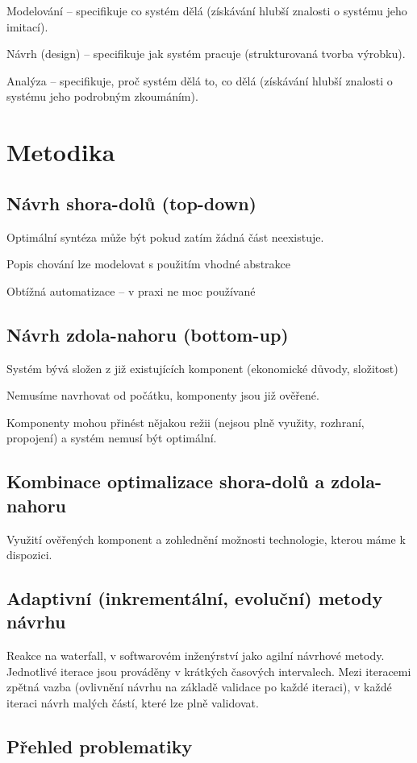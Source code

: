\documentclass[a4paper, 11pt]{report}
\begin{document}
Modelování -- specifikuje co systém dělá (získávání hlubší znalosti o systému jeho imitací).

Návrh (design) -- specifikuje jak systém pracuje (strukturovaná tvorba výrobku).

Analýza -- specifikuje, proč systém dělá to, co dělá (získávání hlubší znalosti o systému jeho podrobným zkoumáním).

\section{Metodika}
\subsection{Návrh shora-dolů (top-down)}
Optimální syntéza může být pokud zatím žádná část neexistuje.

Popis chování lze modelovat s použitím vhodné abstrakce

Obtížná automatizace -- v praxi ne moc používané

\subsection{Návrh zdola-nahoru (bottom-up)}
Systém bývá složen z již existujících komponent (ekonomické důvody, složitost)

Nemusíme navrhovat od počátku, komponenty jsou již ověřené.

Komponenty mohou přinést nějakou režii (nejsou plně využity, rozhraní, propojení) a systém nemusí být optimální.

\subsection{Kombinace optimalizace shora-dolů a zdola-nahoru}
Využití ověřených komponent a zohlednění možnosti technologie, kterou máme k dispozici.

\subsection{Adaptivní (inkrementální, evoluční) metody návrhu}
Reakce na waterfall, v softwarovém inženýrství jako agilní návrhové metody. Jednotlivé iterace jsou prováděny v krátkých časových intervalech. Mezi iteracemi zpětná vazba (ovlivnění návrhu na základě validace po každé iteraci), v každé iteraci návrh malých částí, které lze plně validovat.

\subsection{Přehled problematiky}
\end{document}
